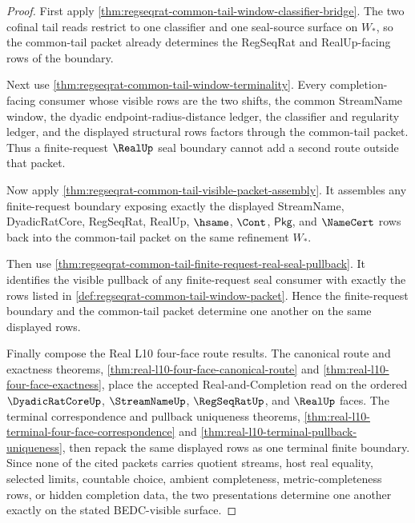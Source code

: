 \begin{proof}
First apply \autoref{thm:regseqrat-common-tail-window-classifier-bridge}. The two cofinal tail reads restrict to one classifier and one seal-source surface on $W_\ast$, so the common-tail packet already determines the RegSeqRat and RealUp-facing rows of the boundary.

Next use \autoref{thm:regseqrat-common-tail-window-terminality}. Every completion-facing consumer whose visible rows are the two shifts, the common StreamName window, the dyadic endpoint-radius-distance ledger, the classifier and regularity ledger, and the displayed structural rows factors through the common-tail packet. Thus a finite-request $\RealUp$ seal boundary cannot add a second route outside that packet.

Now apply \autoref{thm:regseqrat-common-tail-visible-packet-assembly}. It assembles any finite-request boundary exposing exactly the displayed StreamName, DyadicRatCore, RegSeqRat, RealUp, $\hsame$, $\Cont$, $\mathsf{Pkg}$, and $\NameCert$ rows back into the common-tail packet on the same refinement $W_\ast$.

Then use \autoref{thm:regseqrat-common-tail-finite-request-real-seal-pullback}. It identifies the visible pullback of any finite-request seal consumer with exactly the rows listed in \autoref{def:regseqrat-common-tail-window-packet}. Hence the finite-request boundary and the common-tail packet determine one another on the same displayed rows.

Finally compose the Real L10 four-face route results. The canonical route and exactness theorems, \autoref{thm:real-l10-four-face-canonical-route} and \autoref{thm:real-l10-four-face-exactness}, place the accepted Real-and-Completion read on the ordered $\DyadicRatCoreUp$, $\StreamNameUp$, $\RegSeqRatUp$, and $\RealUp$ faces. The terminal correspondence and pullback uniqueness theorems, \autoref{thm:real-l10-terminal-four-face-correspondence} and \autoref{thm:real-l10-terminal-pullback-uniqueness}, then repack the same displayed rows as one terminal finite boundary. Since none of the cited packets carries quotient streams, host real equality, selected limits, countable choice, ambient completeness, metric-completeness rows, or hidden completion data, the two presentations determine one another exactly on the stated BEDC-visible surface.
\end{proof}

